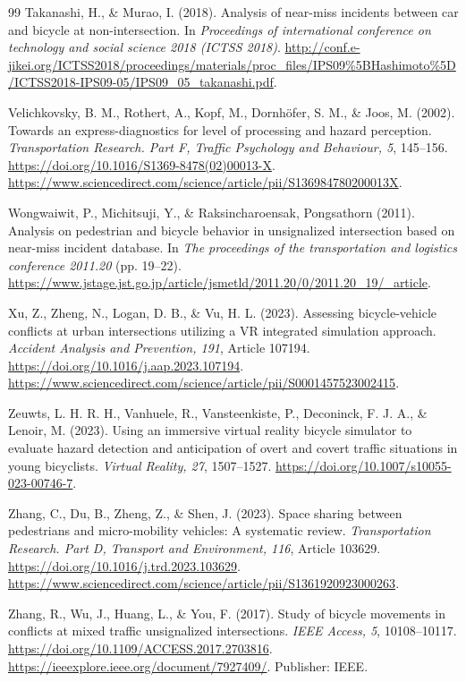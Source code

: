 \begin{thebibliography}{99}
Takanashi, H., \& Murao, I. (2018). Analysis of near-miss incidents between car
and bicycle at non-intersection. In \emph{Proceedings of international conference
on technology and social science 2018 (ICTSS 2018)}.
\url{http://conf.e-jikei.org/ICTSS2018/proceedings/materials/proc_files/IPS09\%5BHashimoto\%5D/ICTSS2018-IPS09-05/IPS09_05_takanashi.pdf}.

Velichkovsky, B. M., Rothert, A., Kopf, M., Dornhöfer, S. M., \& Joos, M.
(2002). Towards an express-diagnostics for level of processing and hazard
perception. \emph{Transportation Research. Part F, Traffic Psychology and
Behaviour, 5}, 145--156.
\url{https://doi.org/10.1016/S1369-8478(02)00013-X}.
\url{https://www.sciencedirect.com/science/article/pii/S136984780200013X}.

Wongwaiwit, P., Michitsuji, Y., \& Raksincharoensak, Pongsathorn (2011).
Analysis on pedestrian and bicycle behavior in unsignalized intersection based
on near-miss incident database. In \emph{The proceedings of the transportation
and logistics conference 2011.20} (pp. 19--22).
\url{https://www.jstage.jst.go.jp/article/jsmetld/2011.20/0/2011.20_19/_article}.

Xu, Z., Zheng, N., Logan, D. B., \& Vu, H. L. (2023). Assessing bicycle-vehicle
conflicts at urban intersections utilizing a VR integrated simulation approach.
\emph{Accident Analysis and Prevention, 191}, Article 107194.
\url{https://doi.org/10.1016/j.aap.2023.107194}.
\url{https://www.sciencedirect.com/science/article/pii/S0001457523002415}.

Zeuwts, L. H. R. H., Vanhuele, R., Vansteenkiste, P., Deconinck, F. J. A., \&
Lenoir, M. (2023). Using an immersive virtual reality bicycle simulator to
evaluate hazard detection and anticipation of overt and covert traffic
situations in young bicyclists. \emph{Virtual Reality, 27}, 1507--1527.
\url{https://doi.org/10.1007/s10055-023-00746-7}.

Zhang, C., Du, B., Zheng, Z., \& Shen, J. (2023). Space sharing between
pedestrians and micro-mobility vehicles: A systematic review.
\emph{Transportation Research. Part D, Transport and Environment, 116}, Article
103629. \url{https://doi.org/10.1016/j.trd.2023.103629}.
\url{https://www.sciencedirect.com/science/article/pii/S1361920923000263}.

Zhang, R., Wu, J., Huang, L., \& You, F. (2017). Study of bicycle movements in
conflicts at mixed traffic unsignalized intersections. \emph{IEEE Access, 5},
10108--10117. \url{https://doi.org/10.1109/ACCESS.2017.2703816}.
\url{https://ieeexplore.ieee.org/document/7927409/}. Publisher: IEEE.

\end{thebibliography}
